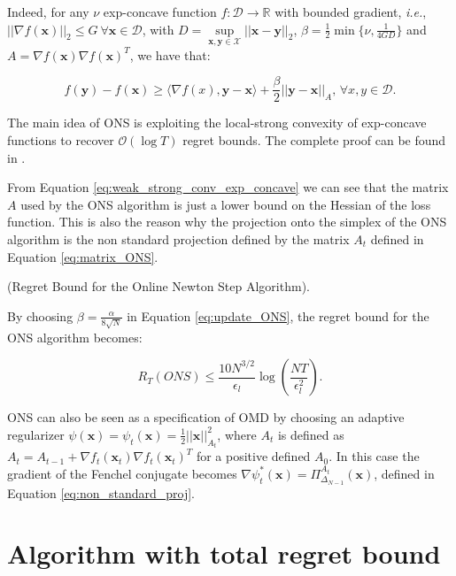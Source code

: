 Indeed, for any $\nu$ exp-concave function $f:\mathcal D\to\mathbb R$ with bounded gradient, \emph{i.e.}, $||\nabla f(\mathbf x)||_2\le G\ \forall \mathbf x\in\mathcal D$, with $D=\sup\limits_{\mathbf x,\mathbf y\in\mathcal X}||\mathbf x-\mathbf y||_2$, $\beta=\frac{1}{2}\min\{\nu,\frac{1}{4GD}\}$ and $A=\nabla f(\mathbf x)\nabla f(\mathbf x)^T$, we have that: 

\begin{equation}\label{eq:weak_strong_conv_exp_concave}
f(\mathbf y)-f(\mathbf x)\ge\langle\nabla f(x),\mathbf y-\mathbf x\rangle+\frac{\beta}{2}||\mathbf y-\mathbf x||_{A},\, \forall x,y\in\mathcal D.
\end{equation}

The main idea of ONS is exploiting the local-strong convexity of exp-concave functions to recover $\mathcal O(\log T)$ regret bounds. The complete proof can be found in \cite{hazan2007logarithmic}.

From Equation \eqref{eq:weak_strong_conv_exp_concave} we can see that the matrix $A$ used by the ONS algorithm is just a lower bound on the Hessian of the loss function. This is also the reason why the projection onto the simplex of the ONS algorithm is the non standard projection defined by the matrix $A_t$ defined in Equation \eqref{eq:matrix_ONS}.

\begin{theorem}(Regret Bound for the Online Newton Step Algorithm).

By choosing $\beta=\frac{\alpha}{8\sqrt{N}}$ in Equation \eqref{eq:update_ONS}, the regret bound for the ONS algorithm becomes:

\begin{equation}\label{eq:regret_ONS}
R_T(ONS)\le\frac{10 N^{3/2}}{\epsilon_l}\log\left(\frac{NT}{\epsilon_l^2}\right).
\end{equation}
\end{theorem}

ONS can also be seen as a specification of OMD \cite{luo2018efficient} by choosing an adaptive regularizer $\psi(\mathbf x)=\psi_t(\mathbf x)=\frac{1}{2}||\mathbf x||_{A_t}^2$, where $A_t$ is defined as $A_t=A_{t-1}+\nabla f_t(\mathbf x_t)\nabla f_t(\mathbf x_t)^T$ for a positive defined $A_0$. In this case the gradient of the Fenchel conjugate becomes $\nabla \psi_t^*(\mathbf x)=\Pi^{A_t}_{\Delta_{N-1}}(\mathbf x)$, defined in Equation \eqref{eq:non_standard_proj}.

\section{Algorithm with total regret bound}

